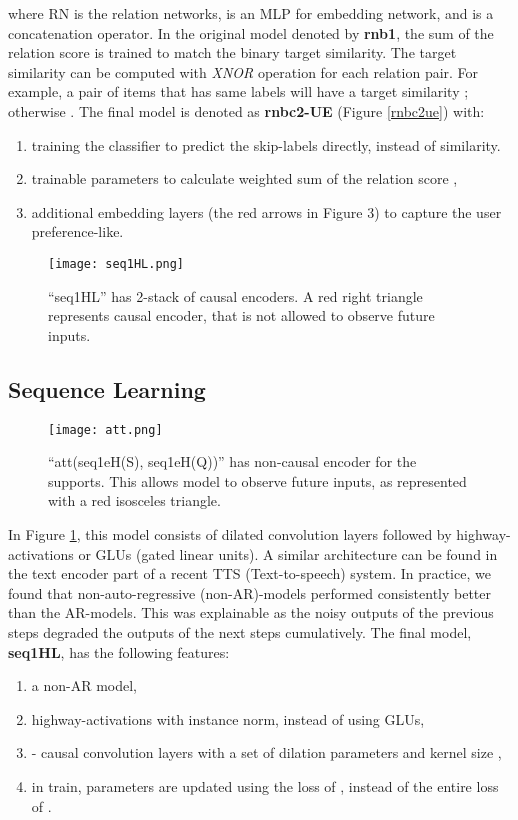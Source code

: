 where RN is the relation networks\cite{santoro2017simple},  is an MLP for embedding network, and  is a concatenation operator. In the original model\cite{sung2018learning} denoted by \textbf{rnb1}, the sum of the relation score is trained to match the binary target similarity. The target similarity can be computed with {\it XNOR} operation for each relation pair. For example, a pair of items that has same labels will have a target similarity ; otherwise . The final model is denoted as \textbf{rnbc2-UE} (Figure \ref{rnbc2ue}) with:
\begin{enumerate}
    \item training the classifier to predict the skip-labels directly, instead of similarity.
    \item trainable parameters to calculate weighted sum of the relation score ,
    \item additional embedding layers (the red arrows in Figure 3) to capture the user preference-like.
\end{enumerate}


\begin{figure}
\texttt{[image: seq1HL.png]}
\caption{``seq1HL'' has 2-stack of causal encoders. A red right triangle represents causal encoder, that is not allowed to observe future inputs.}
\label{seq1hl}
\end{figure}

\subsection{Sequence Learning}
\begin{figure}
\texttt{[image: att.png]}
\caption{``att(seq1eH(S), seq1eH(Q))'' has non-causal encoder for the supports. This allows model to observe future inputs, as represented with a red isosceles triangle.}
\label{att}
\end{figure}
In Figure \ref{seq1hl}, this model consists of dilated convolution layers followed by highway\cite{srivastava2015highway}-activations or GLUs (gated linear units\cite{dauphin2016language}). A similar architecture can be found in the text encoder part of a recent TTS (Text-to-speech) system\cite{dctts}. In practice, we found that non-auto-regressive (non-AR)-models performed consistently better than the AR-models. This was explainable as the noisy outputs of the previous steps degraded the outputs of the next steps cumulatively. The final model, \textbf{seq1HL}, has the following features:
\begin{enumerate}
    \item a non-AR model,
    \item highway-activations with instance norm\cite{vedaldi2016instance}, instead of using GLUs,
    \item - causal convolution layers with a set of dilation parameters  and kernel size ,
    \item in train, parameters are updated using the loss of , instead of the entire loss of .
\end{enumerate}

